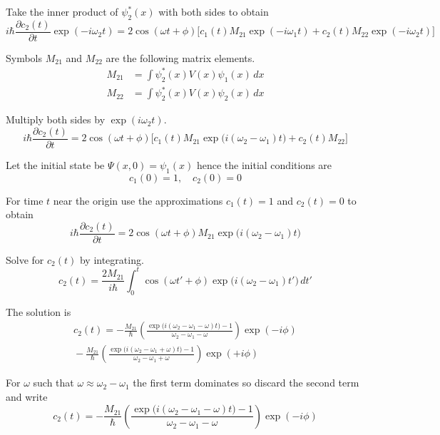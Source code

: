 Take the inner product of $\psi_2^*(x)$ with both sides to obtain
\begin{equation*}
i\hbar\frac{\partial c_2(t)}{\partial t}\exp(-i\omega_2t)
=2\cos(\omega t+\phi)
\biggl[
c_1(t)M_{21}\exp(-i\omega_1t)+
c_2(t)M_{22}\exp(-i\omega_2t)
\biggr]
\end{equation*}

Symbols $M_{21}$ and $M_{22}$ are the following matrix elements.
\begin{align*}
M_{21}&=\int\psi_2^*(x)V(x)\psi_1(x)\,dx
\\
M_{22}&=\int\psi_2^*(x)V(x)\psi_2(x)\,dx
\end{align*}

Multiply both sides by $\exp(i\omega_2t)$.
\begin{equation*}
i\hbar\frac{\partial c_2(t)}{\partial t}
=2\cos(\omega t+\phi)
\biggl[
c_1(t)M_{21}\exp\bigl(i(\omega_2-\omega_1)t\bigr)+c_2(t)M_{22}
\biggr]
\end{equation*}

Let the initial state be $\Psi(x,0)=\psi_1(x)$ hence the initial conditions are
\begin{equation*}
c_1(0)=1,\quad c_2(0)=0
\end{equation*}

For time $t$ near the origin use the approximations $c_1(t)=1$ and $c_2(t)=0$ to obtain
\begin{equation*}
i\hbar\frac{\partial c_2(t)}{\partial t}
=2\cos(\omega t+\phi)M_{21}\exp\bigl(i(\omega_2-\omega_1)t\bigr)
\end{equation*}

Solve for $c_2(t)$ by integrating.
\begin{equation*}
c_2(t)=\frac{2M_{21}}{i\hbar}
\int_0^t\cos(\omega t'+\phi)\exp\bigl(i(\omega_2-\omega_1)t'\bigr)\,dt'
\end{equation*}

The solution is
\begin{multline*}
c_2(t)
=-\frac{M_{21}}{\hbar}
\left(
\frac{\exp\bigl(i(\omega_2-\omega_1-\omega) t\bigr)-1}{\omega_2-\omega_1-\omega}
\right)\exp(-i\phi)
\\{}-\frac{M_{21}}{\hbar}
\left(
\frac{\exp\bigl(i(\omega_2-\omega_1+\omega) t\bigr)-1}{\omega_2-\omega_1+\omega}
\right)\exp(+i\phi)
\tag{1}
\end{multline*}

For $\omega$ such that $\omega\approx\omega_2-\omega_1$ the first term
dominates so discard the second term and write
\begin{equation*}
c_2(t)=-\frac{M_{21}}{\hbar}
\left(
\frac{\exp\bigl(i(\omega_2-\omega_1-\omega) t\bigr)-1}{\omega_2-\omega_1-\omega}
\right)\exp(-i\phi)
\end{equation*}

